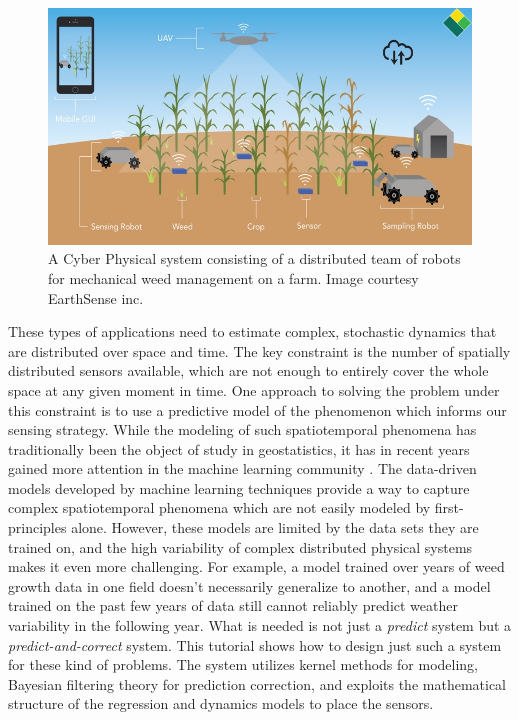 \documentclass[letterpaper,12pt,peerreviewca,draftcls]{IEEEtran}
\begin{document}
\begin{figure}[h] %
	\centering
	\includegraphics[width=\columnwidth]{"Figure 1"}
		\caption{A Cyber Physical system consisting of a distributed team of robots for mechanical weed management on a farm. Image courtesy EarthSense inc.}
	\label{fig:cps}
\end{figure}


These types of applications need to estimate complex, stochastic dynamics that are distributed over space and time. The key constraint is the number of spatially distributed sensors available, which are not enough to entirely cover the whole space at any given moment in time. One approach to solving the problem under this constraint is to use a predictive model of the phenomenon which informs our sensing strategy. %
While the modeling of such spatiotemporal phenomena has traditionally been the object of study in geostatistics, it has in recent years gained more attention in the machine learning community \cite{cressie2011statistics}. The data-driven models developed by machine learning techniques provide a way to capture complex spatiotemporal phenomena which are not easily modeled by first-principles alone. However, these models are limited by the data sets they are trained on, and the high variability of complex distributed physical systems makes it even more challenging. For example, a model trained over years of weed growth data in one field doesn't necessarily generalize to another, and a model trained on the past few years of data still cannot reliably predict weather variability in the following year. What is needed is not just a \textit{predict} system but a \textit{predict-and-correct} system. This tutorial shows how to design just such a system for these kind of problems. The system utilizes kernel methods for modeling, Bayesian filtering theory for prediction correction, and exploits the mathematical structure of the regression and dynamics models to place the sensors. 
\end{document}
